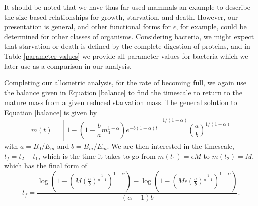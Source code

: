 \documentclass[12pt,english]{article}
\begin{document}
\begin{spacing}{1.9}
It should be noted that we have thus far used mammals an example to describe the size-based relationships for growth, starvation, and death. However, our presentation is general, and other functional forms for $\epsilon$, for example, could be determined for other classes of organisms. Considering bacteria, we might expect that starvation or death is defined by the complete digestion of proteins, and in Table \ref{parameter-values} we provide all parameter values for bacteria which we later use as a comparison in our analysis. 

Completing our allometric analysis, for the rate of becoming full, we again use the balance given in Equation \ref{balance} to find the timescale to return to the mature mass from a given reduced starvation mass. The general solution to Equation \ref{balance} is given by
\begin{equation}
m\left(t\right)=\left[1-\left(1-\frac{b}{a}m_{0}^{1-\alpha}\right)e^{-b\left(1-\alpha\right)t}\right]^{1/\left(1-\alpha\right)}\left(\frac{a}{b}\right)^{1/\left(1-\alpha\right)}
\end{equation}
with $a=B_{0}/E_{m}$ and $b=B_{m}/E_{m}$. We are then interested in the timescale, $t_{f}=t_{2}-t_{1}$, which is the time it takes to go from $m\left(t_{1}\right)=\epsilon M$ to $m\left(t_{2}\right)=M$, which has the final form of 
\begin{equation}
t_{f}=\frac{\log \left(1-\left(M \left(\frac{a}{b}\right)^{\frac{1}{\alpha -1}}\right)^{1-\alpha }\right)-\log \left(1-\left(M \epsilon  \left(\frac{a}{b}\right)^{\frac{1}{\alpha
   -1}}\right)^{1-\alpha }\right)}{(\alpha -1) b}.
\end{equation}


\end{spacing}
\end{document}
